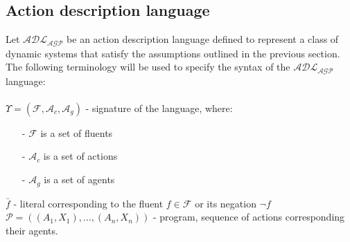 \documentclass[a4paper]{article}
\begin{document}
\subsection{Action description language}
%
Let $\mathcal{ADL_{AGP}}$ be an action description language defined to represent a class of dynamic systems that satisfy the assumptions outlined in the previous section. The following terminology will be used to specify the syntax of the $\mathcal{ADL_{AGP}}$ language: \\~\\
$\Upsilon = (\mathcal{F}, \mathcal{A}_c, \mathcal{A}_g)$ - signature of the language, where:
\begin{itemize}
    \item[-] $\mathcal{F}$ is a set of fluents
    \item[-] $\mathcal{A}_c$ is a set of actions
    \item[-] $\mathcal{A}_g$ is a set of agents
\end{itemize}
$\bar{f}$ - literal corresponding to the fluent $f \in \mathcal{F}$ or its negation $\neg f$ \\[0.5\baselineskip]
$\mathcal{P} = ((A_1, X_1),\dotsc,(A_n, X_n))$ - program, sequence of actions corresponding their agents.
%
\end{document}
